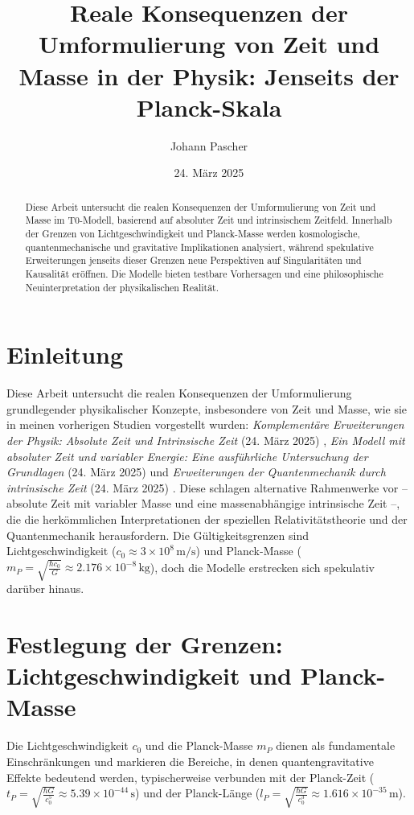 \documentclass[a4paper,12pt]{article}
\title{Reale Konsequenzen der Umformulierung von Zeit und Masse in der Physik: Jenseits der Planck-Skala}
\author{Johann Pascher}
\date{24. März 2025}
\begin{document}
	
	\maketitle
	
	\begin{abstract}
		Diese Arbeit untersucht die realen Konsequenzen der Umformulierung von Zeit und Masse im T0-Modell, basierend auf absoluter Zeit und intrinsischem Zeitfeld. Innerhalb der Grenzen von Lichtgeschwindigkeit und Planck-Masse werden kosmologische, quantenmechanische und gravitative Implikationen analysiert, während spekulative Erweiterungen jenseits dieser Grenzen neue Perspektiven auf Singularitäten und Kausalität eröffnen. Die Modelle bieten testbare Vorhersagen und eine philosophische Neuinterpretation der physikalischen Realität.
	\end{abstract}
	
	\tableofcontents
	\newpage
	
	\section{Einleitung}
	Diese Arbeit untersucht die realen Konsequenzen der Umformulierung grundlegender physikalischer Konzepte, insbesondere von Zeit und Masse, wie sie in meinen vorherigen Studien vorgestellt wurden: \textit{Komplementäre Erweiterungen der Physik: Absolute Zeit und Intrinsische Zeit} (24. März 2025) \cite{komplementaer}, \textit{Ein Modell mit absoluter Zeit und variabler Energie: Eine ausführliche Untersuchung der Grundlagen} (24. März 2025) \cite{absolateZeit} und \textit{Erweiterungen der Quantenmechanik durch intrinsische Zeit} (24. März 2025) \cite{erweiterungenQM}. Diese schlagen alternative Rahmenwerke vor – absolute Zeit mit variabler Masse und eine massenabhängige intrinsische Zeit –, die die herkömmlichen Interpretationen der speziellen Relativitätstheorie und der Quantenmechanik herausfordern. Die Gültigkeitsgrenzen sind Lichtgeschwindigkeit (\( c_0 \approx 3 \times 10^8 \, \text{m/s} \)) und Planck-Masse (\( m_P = \sqrt{\frac{\hbar c_0}{G}} \approx 2.176 \times 10^{-8} \, \text{kg} \)), doch die Modelle erstrecken sich spekulativ darüber hinaus.
	
	\section{Festlegung der Grenzen: Lichtgeschwindigkeit und Planck-Masse}
	Die Lichtgeschwindigkeit \( c_0 \) und die Planck-Masse \( m_P \) dienen als fundamentale Einschränkungen und markieren die Bereiche, in denen quantengravitative Effekte bedeutend werden, typischerweise verbunden mit der Planck-Zeit (\( t_P = \sqrt{\frac{\hbar G}{c_0^5}} \approx 5.39 \times 10^{-44} \, \text{s} \)) und der Planck-Länge (\( l_P = \sqrt{\frac{\hbar G}{c_0^3}} \approx 1.616 \times 10^{-35} \, \text{m} \)).
	
\end{document}
